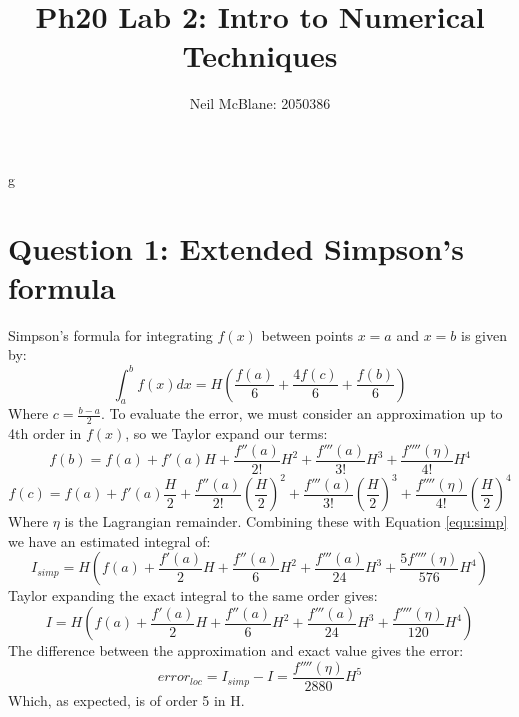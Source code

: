 g\documentclass{article}
\begin{document}
\title{Ph20 Lab 2: Intro to Numerical Techniques}
\author{Neil McBlane: 2050386}

\maketitle

\section*{Question 1: Extended Simpson's formula}
Simpson's formula for integrating $f(x)$ between points $x=a$ and $x=b$ is given by:
\begin{equation}
\label{equ:simp}
  \int_a^b f(x)dx = H\left(\frac{f(a)}{6} + \frac{4f(c)}{6} + \frac{f(b)}{6}\right)
\end{equation}
Where $c = \frac{b-a}{2}$. To evaluate the error, we must consider an approximation up to 4th order in $f(x)$, so we Taylor expand our terms:
\begin{equation}
  f(b) = f(a) + f'(a)H + \frac{f''(a)}{2!}H^2 + \frac{f'''(a)}{3!}H^3 + \frac{f''''(\eta)}{4!}H^4
\end{equation} 
\begin{equation}
  f(c) = f(a) + f'(a)\frac{H}{2} + \frac{f''(a)}{2!}\left(\frac{H}{2}\right)^2 + \frac{f'''(a)}{3!}\left(\frac{H}{2}\right)^3 + \frac{f''''(\eta)}{4!}\left(\frac{H}{2}\right)^4
\end{equation}
Where $\eta$ is the Lagrangian remainder. Combining these with Equation \ref{equ:simp} we have an estimated integral of:
\begin{equation}
\label{equ:simpapprox}
  I_{simp} = H\left(f(a) + \frac{f'(a)}{2}H + \frac{f''(a)}{6}H^2 + \frac{f'''(a)}{24}H^3 + \frac{5f''''(\eta)}{576}H^4\right)
\end{equation}
Taylor expanding the exact integral to the same order gives:
\begin{equation}
  I = H\left(f(a) + \frac{f'(a)}{2}H + \frac{f''(a)}{6}H^2 + \frac{f'''(a)}{24}H^3 + \frac{f''''(\eta)}{120}H^4\right)
\end{equation}
The difference between the approximation and exact value gives the error:
\begin{equation}
\label{equ:localerr}
 error_{loc} = I_{simp} - I = \frac{f''''(\eta)}{2880}H^5
\end{equation}
Which, as expected, is of order 5 in H.
\end{document}
